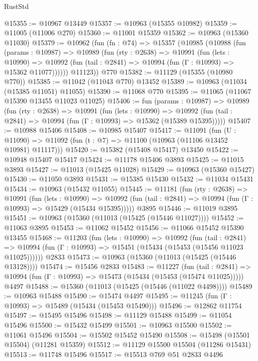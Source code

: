 \begin{lexlean}{RustStd}
\begin{coremodule}
@15355 := @10967 @13449
@15357 := @10963 (@15355 @10982)
@15359 := @11005 (@11006 @270)
@15360 := @11001 @15359
@15362 := @10963 (@15360 @11030)
@15379 := @10962
    (fun (fn : @74) =>
    @15357
      (@10985
        (@10988
          (fun (params : @10987) =>
          @10989
            (fun (rty : @2638) =>
            @10991
              (fun (lets : @10990) =>
              @10992 (fun (tail : @2841) => @10994 (fun (Γ : @10993) => @15362 @11077))))))
        @11123))
    @770
@15382 := @11129 (@15355 (@10980 @770))
@15385 := @11042 (@11043 @770) @13452
@15389 := @10963 (@11034 (@15385 @11051) @11055)
@15390 := @11068 @770
@15395 := @11065 (@11067 @15390 @13455 @11023 @11025)
@15406 := fun (params : @10987) =>
  @10989
    (fun (rty : @2638) =>
    @10991
      (fun (lets : @10990) =>
      @10992 (fun (tail : @2841) => @10994 (fun (Γ : @10993) => @15362 (@15389 @15395)))))
@15407 := @10988 @15406
@15408 := @10985 @15407
@15417 := @11091
    (fun (U : @11090) => @11092 (fun (t : @7) => @11100 (@10963 (@11106 @13452 @10981) @11117)))
@15420 := @15382 (@15408 @15417) @13450
@15422 := @10948 @15407 @15417
@15424 := @11178 @15406 @3893
@15425 := @11015 @3893
@15427 := @11013 (@15425 @11028)
@15429 := @10963 (@15360 @15427)
@15430 := @11050 @3893
@15431 := @15385 @15430
@15432 := @11034 @15431
@15434 := @10963 (@15432 @11055)
@15445 := @11181
    (fun (rty : @2638) =>
    @10991
      (fun (lets : @10990) =>
      @10992 (fun (tail : @2841) => @10994 (fun (Γ : @10993) => @15429 (@15434 @15395)))))
    @3895
@15446 := @11019 @3895
@15451 := @10963 (@15360 (@11013 (@15425 (@15446 @11027))))
@15452 := @11063 @3895
@15453 := @11062 @15452
@15456 := @11066 @15452 @15390 @13455
@15468 := @11203
    (fun (lets : @10990) =>
    @10992
      (fun (tail : @2841) =>
      @10994 (fun (Γ : @10993) => @15451 (@15434 (@15453 (@15456 @11023 @11025))))))
    @2833
@15473 := @10963 (@15360 (@11013 (@15425 (@15446 @13128))))
@15474 := @15456 @2833
@15483 := @11227
    (fun (tail : @2841) => @10994 (fun (Γ : @10993) => @15473 (@15434 (@15453 (@15474 @11025)))))
    @4497
@15488 := @15360 (@11013 (@15425 (@15446 (@11022 @4498))))
@15489 := @10963 @15488
@15490 := @15474 @4497
@15495 := @11245 (fun (Γ : @10993) => @15489 (@15434 (@15453 @15490)))
@15496 := @12862 @11754
@15497 := @15495 @15496
@15498 := @11129 @15488
@15499 := @11054 @15496
@15500 := @15432 @15499
@15501 := @10963 @15500
@15502 := @11061 @15496
@15504 := @15502 @15452 @15490
@15508 := @15498 (@15501 @15504) (@11281 @15359)
@15512 := @11129 @15500 @15504 (@11286 @15431)
@15513 := @11748 @15496
@15517 := @15513 @769 @51 @2833 @4496

\end{coremodule}
\end{lexlean}
